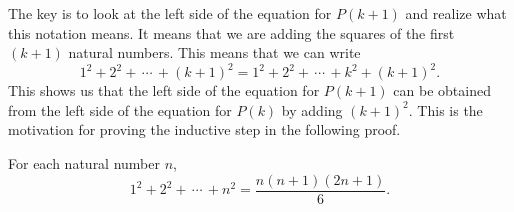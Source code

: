 \newpar
The key is to look at the left side of the equation for  $P( {k + 1} )$ and realize what this notation means.  It means that we are adding the squares of the first  $\left( {k + 1} \right)$ natural numbers.  This means that we can write
\[
1^2  + 2^2  + \, \cdots \, + \left( {k + 1} \right)^2  = 1^2  + 2^2  + \, \cdots \, + k^2  + \left( {k + 1} \right)^2.
\]
This shows us that the left side of the equation for  $P( {k + 1} )$ can be obtained from the left side of the equation for  $P( k )$ by adding  $\left( {k + 1} \right)^2 $.  This is the motivation for proving the inductive step in the following proof.
%
\begin{proposition} \label{P:suminduction}
For each natural number  $n$, 
\[
1^2  + 2^2  + \, \cdots \, + n^2  = \dfrac{{n(n + 1)(2n + 1)}}{6}.
\]
\end{proposition}
%
\setcounter{equation}{0}

